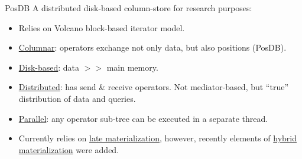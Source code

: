 \documentclass[compress, dvipsnames, unicode]{beamer}
\begin{document}

\begin{frame}{PosDB}
A distributed disk-based column-store for research purposes:
\vspace{0.3em}
\begin{itemize}
	\setlength\itemsep{0.5em}
	\item Relies on Volcano block-based iterator model.
	\item \underline{Columnar}: operators exchange not only data, but also positions (\alert{PosDB}).
	\item \underline{Disk-based}: data $>>$ main memory.
	\item \underline{Distributed}: has send \& receive operators.
	Not mediator-based, but ``true'' distribution of data and queries.
	\item \underline{Parallel}: any operator sub-tree can be executed in a separate thread.
	\item Currently relies on \underline{late materialization}, however, recently elements of \underline{hybrid materialization} were added.
\end{itemize}
\end{frame}
\end{document}
